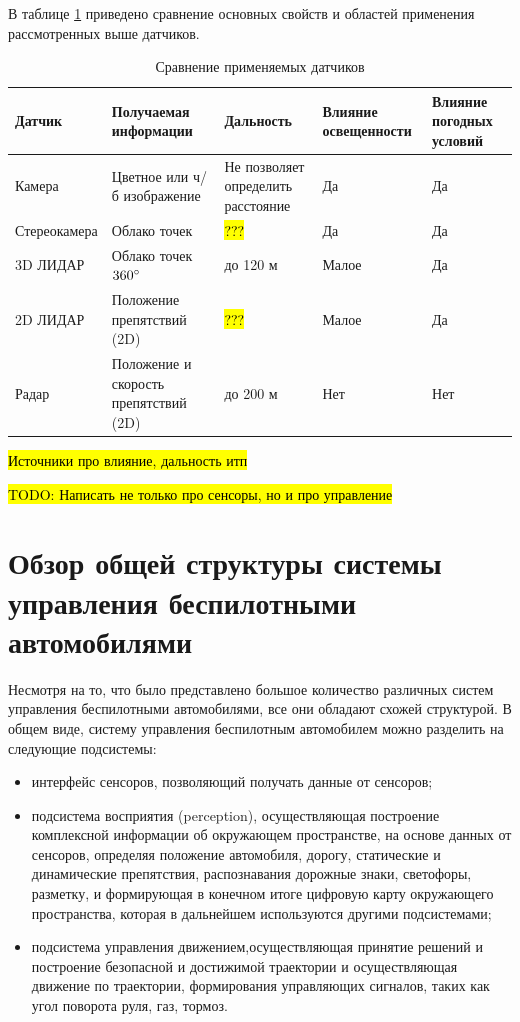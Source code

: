 В таблице \ref{tab:sensors_compare} приведено сравнение основных свойств и областей применения рассмотренных
выше датчиков.

\begin{table}[h]
    \caption{Сравнение применяемых датчиков}
    \label{tab:sensors_compare}
    \begin{tabularx}{\textwidth}{|X|X|X|X|X|}
        \hline
        Датчик        & Получаемая информации & Дальность & Влияние освещенности & Влияние погодных условий  \\
        \hline
        Камера        & Цветное или ч/б изображение & Не позволяет определить расстояние  & Да & Да \\
        \hline
        Стереокамера  & Облако точек & \hl{???} & Да & Да \\
        \hline
        3D ЛИДАР      & Облако точек $360^{\circ}$  & до 120 м  & Малое & Да \\
        \hline
        2D ЛИДАР      & Положение препятствий (2D) & \hl{???} & Малое & Да \\
        \hline
        Радар         & Положение и скорость препятствий (2D) & до 200 м & Нет & Нет \\
        \hline
    \end{tabularx}
\end{table}

\hl{Источники про влияние, дальность итп}

\hl{TODO: Написать не только про сенсоры, но и про управление}

\section{Обзор общей структуры системы управления беспилотными автомобилями}

Несмотря на то, что было представлено большое количество различных систем управления беспилотными
автомобилями, все они обладают схожей структурой. В общем виде, систему управления беспилотным автомобилем
можно разделить на следующие подсистемы:
\begin{itemize}
    \item интерфейс сенсоров, позволяющий получать данные от сенсоров;
    \item подсистема восприятия (perception), осуществляющая построение комплексной информации об
          окружающем пространстве, на основе данных от сенсоров, определяя положение автомобиля,
          дорогу, статические и динамические препятствия, распознавания дорожные знаки, светофоры, разметку,
          и формирующая в конечном итоге цифровую карту окружающего пространства, которая в дальнейшем
          используются другими подсистемами;
    \item подсистема управления движением,осуществляющая принятие решений и построение безопасной
          и достижимой траектории и осуществляющая движение по траектории, формирования управляющих сигналов,
          таких как угол поворота руля, газ, тормоз.
\end{itemize}

